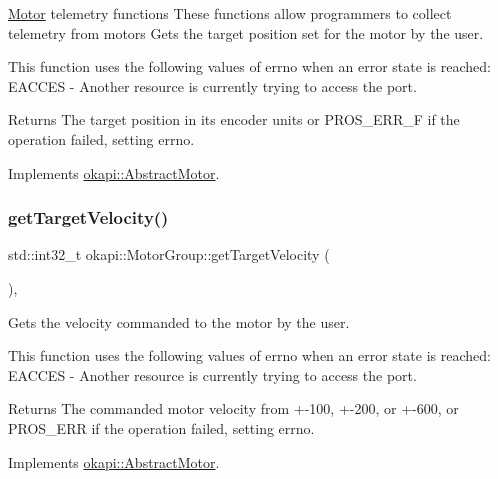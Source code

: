 \mbox{\hyperlink{classokapi_1_1Motor}{Motor}} telemetry functions These functions allow programmers to collect telemetry from motors Gets the target position set for the motor by the user.

This function uses the following values of errno when an error state is reached\+: E\+A\+C\+C\+ES -\/ Another resource is currently trying to access the port.

\begin{DoxyReturn}{Returns}
The target position in its encoder units or {\ttfamily P\+R\+O\+S\+\_\+\+E\+R\+R\+\_\+F} if the operation failed, setting errno. 
\end{DoxyReturn}


Implements \mbox{\hyperlink{classokapi_1_1AbstractMotor_a144377e461ec5801289c37bab5132cce}{okapi\+::\+Abstract\+Motor}}.

\mbox{\label{classokapi_1_1MotorGroup_a841736ae664104fb38ffff33ef763394}} 
\subsubsection{\texorpdfstring{getTargetVelocity()}{getTargetVelocity()}}
{\footnotesize\ttfamily std\+::int32\+\_\+t okapi\+::\+Motor\+Group\+::get\+Target\+Velocity (\begin{DoxyParamCaption}{ }\end{DoxyParamCaption})\hspace{0.3cm}{\ttfamily [override]}, {\ttfamily [virtual]}}

Gets the velocity commanded to the motor by the user.

This function uses the following values of errno when an error state is reached\+: E\+A\+C\+C\+ES -\/ Another resource is currently trying to access the port.

\begin{DoxyReturn}{Returns}
The commanded motor velocity from +-\/100, +-\/200, or +-\/600, or {\ttfamily P\+R\+O\+S\+\_\+\+E\+RR} if the operation failed, setting errno. 
\end{DoxyReturn}


Implements \mbox{\hyperlink{classokapi_1_1AbstractMotor_a96b02cca7b51f75c01d2d22aab474fe4}{okapi\+::\+Abstract\+Motor}}.

\mbox{\label{classokapi_1_1MotorGroup_acba91d770dbc7e38f59070e8d5957d6d}} 
